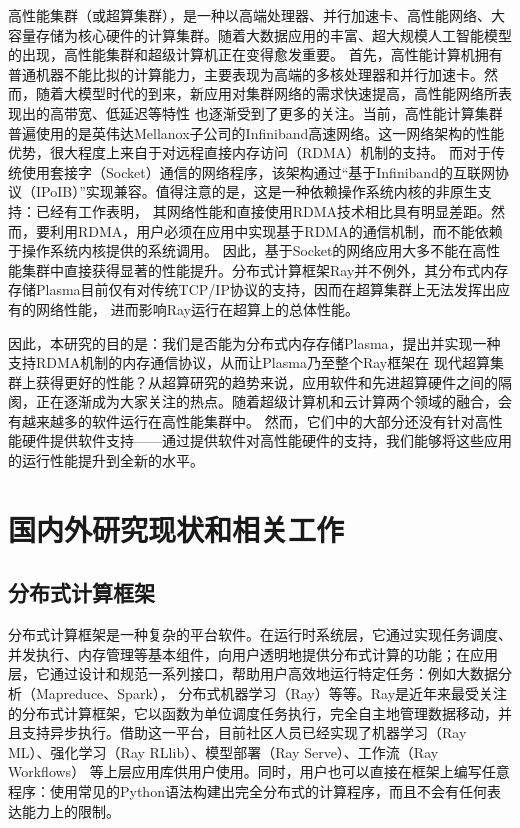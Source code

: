 高性能集群（或超算集群），是一种以高端处理器、并行加速卡、高性能网络、大容量存储为核心硬件的计算集群。随着大数据应用的丰富、超大规模人工智能模型的出现，高性能集群和超级计算机正在变得愈发重要。
首先，高性能计算机拥有普通机器不能比拟的计算能力，主要表现为高端的多核处理器和并行加速卡。然而，随着大模型时代的到来，新应用对集群网络的需求快速提高，高性能网络所表现出的高带宽、低延迟等特性
也逐渐受到了更多的关注。当前，高性能计算集群普遍使用的是英伟达Mellanox子公司的Infiniband高速网络\cite{pfister2001introduction}。这一网络架构的性能优势，很大程度上来自于对远程直接内存访问（RDMA）机制的支持。
而对于传统使用套接字（Socket）通信的网络程序，该架构通过“基于Infiniband的互联网协议（IPoIB）”实现兼容。值得注意的是，这是一种依赖操作系统内核的非原生支持：已经有工作\cite{mitchell2013using}表明，
其网络性能和直接使用RDMA技术相比具有明显差距。然而，要利用RDMA，用户必须在应用中实现基于RDMA的通信机制，而不能依赖于操作系统内核提供的系统调用。
因此，基于Socket的网络应用大多不能在高性能集群中直接获得显著的性能提升。分布式计算框架Ray并不例外，其分布式内存存储Plasma目前仅有对传统TCP/IP协议的支持，因而在超算集群上无法发挥出应有的网络性能，
进而影响Ray运行在超算上的总体性能。

因此，本研究的目的是：我们是否能为分布式内存存储Plasma，提出并实现一种支持RDMA机制的内存通信协议，从而让Plasma乃至整个Ray框架在
现代超算集群上获得更好的性能？从超算研究的趋势来说，应用软件和先进超算硬件之间的隔阂，正在逐渐成为大家关注的热点。随着超级计算机和云计算两个领域的融合，会有越来越多的软件运行在高性能集群中。
然而，它们中的大部分还没有针对高性能硬件提供软件支持——通过提供软件对高性能硬件的支持，我们能够将这些应用的运行性能提升到全新的水平。

\section{国内外研究现状和相关工作}
\label{sec:related_work}

\subsection{分布式计算框架}

分布式计算框架是一种复杂的平台软件。在运行时系统层，它通过实现任务调度、并发执行、内存管理等基本组件，向用户透明地提供分布式计算的功能；在应用层，它通过设计和规范一系列接口，帮助用户高效地运行特定任务：例如大数据分析（Mapreduce、Spark），
分布式机器学习（Ray）等等。Ray是近年来最受关注的分布式计算框架，它以函数为单位调度任务执行，完全自主地管理数据移动，并且支持异步执行。借助这一平台，目前社区人员已经实现了机器学习（Ray ML）、强化学习（Ray RLlib）、模型部署（Ray Serve）、工作流（Ray Workflows）
等上层应用库\cite{ray}供用户使用。同时，用户也可以直接在框架上编写任意程序：使用常见的Python语法构建出完全分布式的计算程序，而且不会有任何表达能力上的限制。


